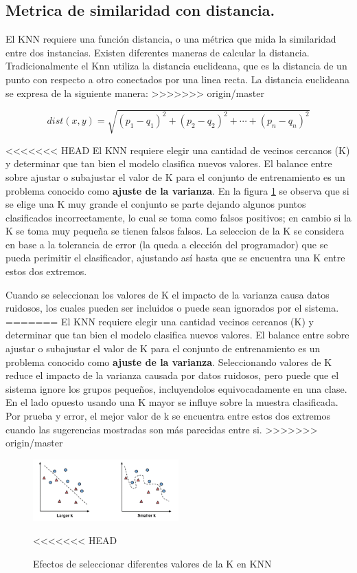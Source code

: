 \subsection{Metrica de similaridad con distancia.}

El KNN requiere una función distancia, o una métrica que mida la similaridad entre dos instancias. Existen diferentes maneras de calcular la distancia. Tradicionalmente el Knn utiliza la distancia euclideana, que es la distancia de un punto con respecto a otro conectados por una linea recta. La distancia euclideana se expresa de la siguiente manera:
>>>>>>> origin/master

\begin{equation}
dist(x,y) = \sqrt{(p_1-q_1)^2 + (p_2-q_2)^2+ \cdots + (p_n - q_n)^2}
\end{equation}

<<<<<<< HEAD
El KNN requiere elegir una cantidad de vecinos cercanos (K) y determinar que tan bien el modelo clasifica nuevos valores. El balance entre sobre ajustar o subajustar el valor de K para el conjunto de entrenamiento es un problema conocido como \textbf{ajuste de la varianza}. En la figura \ref{fig:seleccionK} se observa que si se elige una K muy grande el conjunto se parte dejando algunos puntos clasificados incorrectamente, lo cual se toma como falsos positivos; en cambio si la K se toma muy pequeña se tienen falsos falsos. 
La seleccion de la K se considera en base a la tolerancia de error (la queda a elección  del programador) que se pueda perimitir el clasificador, ajustando así hasta que se encuentra una K entre estos dos extremos.

Cuando se seleccionan los valores de K el impacto de la varianza causa datos ruidosos, los cuales pueden ser incluidos o puede sean ignorados por el sistema.
=======
El KNN requiere elegir una cantidad  vecinos cercanos (K) y  determinar que tan bien el modelo clasifica nuevos valores. El balance entre sobre ajustar o subajustar el valor de K para el conjunto de entrenamiento es un problema conocido como \textbf{ajuste de la varianza}. Seleccionando valores de K reduce el impacto de la varianza causada por datos ruidosos, pero puede que el sistema ignore los grupos pequeños, incluyendolos equivocadamente en una clase. En el lado opuesto usando una K mayor se influye sobre la muestra clasificada. Por prueba y error, el mejor valor de k se encuentra entre estos dos extremos cuando las sugerencias mostradas son más parecidas entre si.
>>>>>>> origin/master


\begin{figure}[ht]
\centering
\includegraphics[width=0.5\textwidth]{IMG_0061.png}
\caption{Efectos de seleccionar diferentes valores  de la K en KNN}
<<<<<<< HEAD
\label{fig:seleccionK}
\end{figure}

